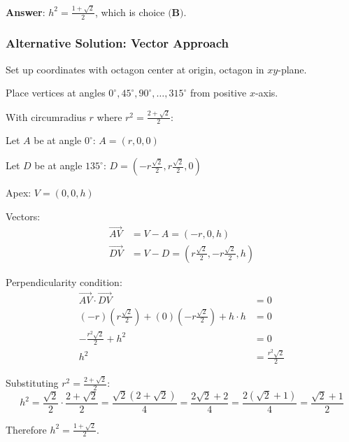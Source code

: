 \documentclass[12pt]{article}
\begin{document}
\begin{solutionbox}
\textbf{Answer}: $h^2 = \boxed{\frac{1+\sqrt{2}}{2}}$, which is choice $\boxed{\textbf{(B)}}$.

\subsubsection*{Alternative Solution: Vector Approach}

Set up coordinates with octagon center at origin, octagon in $xy$-plane.

Place vertices at angles $0^\circ, 45^\circ, 90^\circ, \ldots, 315^\circ$ from positive $x$-axis.

With circumradius $r$ where $r^2 = \frac{2+\sqrt{2}}{2}$:

Let $A$ be at angle $0^\circ$: $A = (r, 0, 0)$

Let $D$ be at angle $135^\circ$: $D = (-r\frac{\sqrt{2}}{2}, r\frac{\sqrt{2}}{2}, 0)$

Apex: $V = (0, 0, h)$

Vectors:
\begin{align*}
\vec{AV} &= V - A = (-r, 0, h) \\
\vec{DV} &= V - D = \left(r\frac{\sqrt{2}}{2}, -r\frac{\sqrt{2}}{2}, h\right)
\end{align*}

Perpendicularity condition:
\begin{align*}
\vec{AV} \cdot \vec{DV} &= 0 \\
(-r)\left(r\frac{\sqrt{2}}{2}\right) + (0)\left(-r\frac{\sqrt{2}}{2}\right) + h \cdot h &= 0 \\
-\frac{r^2\sqrt{2}}{2} + h^2 &= 0 \\
h^2 &= \frac{r^2\sqrt{2}}{2}
\end{align*}

Substituting $r^2 = \frac{2+\sqrt{2}}{2}$:
$$h^2 = \frac{\sqrt{2}}{2} \cdot \frac{2+\sqrt{2}}{2} = \frac{\sqrt{2}(2+\sqrt{2})}{4} = \frac{2\sqrt{2} + 2}{4} = \frac{2(\sqrt{2}+1)}{4} = \frac{\sqrt{2}+1}{2}$$

Therefore $h^2 = \boxed{\frac{1+\sqrt{2}}{2}}$. \quad \checkmark

\end{solutionbox}
\end{document}
